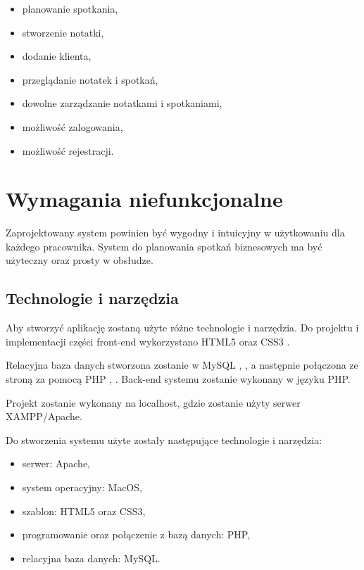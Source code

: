 \documentclass[eng,printmode,openany,oneside]{mgr}
\begin{document}
\begin{itemize}
	\item planowanie spotkania,
	\item stworzenie notatki,
	\item dodanie klienta,
	\item przeglądanie notatek i spotkań,
	\item dowolne zarządzanie notatkami i spotkaniami,
	\item możliwość zalogowania,
	\item możliwość rejestracji.
\end{itemize}




\section{Wymagania niefunkcjonalne}

Zaprojektowany system powinien być wygodny i intuicyjny w użytkowaniu dla każdego pracownika. System do planowania spotkań biznesowych ma być użyteczny oraz prosty w obsłudze. 

\subsection*{Technologie i narzędzia}
Aby stworzyć aplikację zostaną użyte różne technologie i narzędzia. Do projektu i implementacji części front-end wykorzystano HTML5 oraz CSS3 \cite{bib:3}.

Relacyjna baza danych stworzona zostanie w MySQL \cite{bib:1}, \cite{bib:2}, a następnie połączona ze stroną za pomocą PHP \cite{bib:1}, \cite{bib:2}. Back-end systemu zostanie wykonany w języku PHP.

Projekt zostanie wykonany na localhost, gdzie zostanie użyty serwer XAMPP/Apache.

Do stworzenia systemu użyte zostały następujące technologie i narzędzia:
\begin{itemize}
	\item serwer: Apache,
	\item system operacyjny: MacOS,
	\item szablon: HTML5 oraz CSS3,
	\item programowanie oraz połączenie z bazą danych: PHP,
	\item relacyjna baza danych: MySQL.
\end{itemize}
\end{document}
